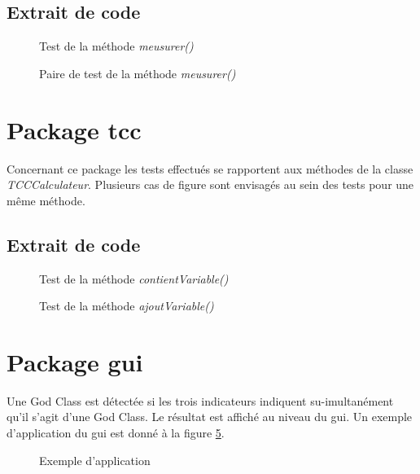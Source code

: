 \documentclass[11pt]{report}
\begin{document}
		\subsection{Extrait de code}
		\begin{figure}[h]
			\centering
			\caption{Test de la méthode \textit{meusurer()}}
			\label{aftd2}
		\end{figure}
		\begin{figure}[h]
			\centering
			\caption{Paire de test de la méthode \textit{meusurer()}}
			\label{aftd}
		\end{figure}
	
	\newpage		
	\section{Package tcc}
		Concernant ce package les tests effectués se rapportent aux méthodes de la classe \textit{TCCCalculateur}. Plusieurs cas de figure sont envisagés au sein des tests pour une même méthode. 
		
		\newpage
		\subsection{Extrait de code}
		\begin{figure}[h]
			\centering
			\caption{Test de la méthode \textit{contientVariable()}}
			\label{tcc}
		\end{figure}
		
		\begin{figure}[h]
			\centering
			\caption{Test de la méthode \textit{ajoutVariable()}}
			\label{tcc2}
		\end{figure}
			
	\newpage	
	\section{Package gui}
		Une God Class est détectée si les trois indicateurs indiquent su-imultanément qu'il s'agit d'une God Class. Le résultat est affiché au niveau du gui. Un exemple d'application du gui est donné à la figure \ref{gui}.
		\begin{figure}[h]
			\centering
			\caption{Exemple d'application}
			\label{gui}
		\end{figure}
	
\end{document}

